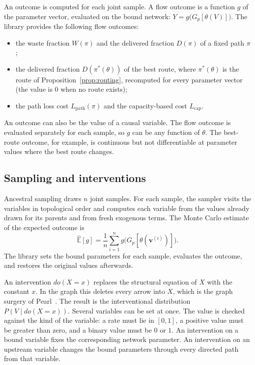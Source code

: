 \documentclass[12pt]{article}
\theoremstyle{plain}
\theoremstyle{definition}
\begin{document}
An outcome is computed for each joint sample. A flow outcome is a function $g$ of the parameter vector, evaluated on the bound network: $Y=g\bigl(G_p[\theta(V)]\bigr)$. The library provides the following flow outcomes:
\begin{itemize}
    \item the waste fraction $W(\pi)$ and the delivered fraction $D(\pi)$ of a fixed path $\pi$;
    \item the delivered fraction $D(\pi^*(\theta))$ of the best route, where $\pi^*(\theta)$ is the route of Proposition~\ref{prop:routing}, recomputed for every parameter vector (the value is $0$ when no route exists);
    \item the path loss cost $L_{\mathrm{path}}(\pi)$ and the capacity-based cost $L_{\mathrm{cap}}$.
\end{itemize}
An outcome can also be the value of a causal variable. The flow outcome is evaluated separately for each sample, so $g$ can be any function of $\theta$. The best-route outcome, for example, is continuous but not differentiable at parameter values where the best route changes.

\subsection{Sampling and interventions}\label{sec:sampling}

Ancestral sampling draws $n$ joint samples. For each sample, the sampler visits the variables in topological order and computes each variable from the values already drawn for its parents and from fresh exogenous terms. The Monte Carlo estimate of the expected outcome is
\begin{equation}\label{eq:mc}
    \widehat{\mathbb{E}}[g]=\frac{1}{n}\sum_{i=1}^{n} g\bigl(G_p[\theta(\mathbf{v}^{(i)})]\bigr).
\end{equation}
The library sets the bound parameters for each sample, evaluates the outcome, and restores the original values afterwards.

An intervention $do(X=x)$ replaces the structural equation of $X$ with the constant $x$. In the graph this deletes every arrow into $X$, which is the graph surgery of Pearl~\cite{pearl2009causality}. The result is the interventional distribution $P(V\mid do(X=x))$. Several variables can be set at once. The value is checked against the kind of the variable: a rate must lie in $[0,1]$, a positive value must be greater than zero, and a binary value must be $0$ or $1$. An intervention on a bound variable fixes the corresponding network parameter. An intervention on an upstream variable changes the bound parameters through every directed path from that variable.
\end{document}

